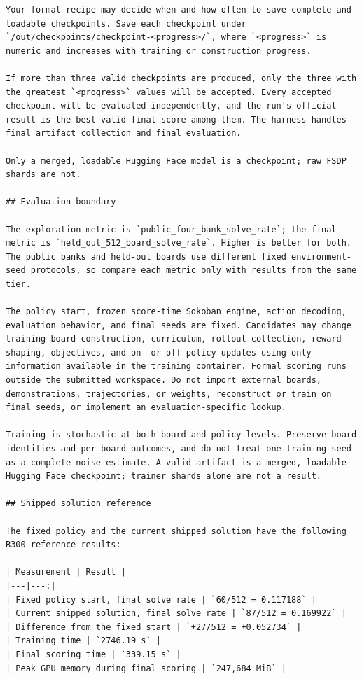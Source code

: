 \begin{lstlisting}[style=contract]
Your formal recipe may decide when and how often to save complete and loadable checkpoints. Save each checkpoint under `/out/checkpoints/checkpoint-<progress>/`, where `<progress>` is numeric and increases with training or construction progress.

If more than three valid checkpoints are produced, only the three with the greatest `<progress>` values will be accepted. Every accepted checkpoint will be evaluated independently, and the run's official result is the best valid final score among them. The harness handles final artifact collection and final evaluation.

Only a merged, loadable Hugging Face model is a checkpoint; raw FSDP shards are not.

## Evaluation boundary

The exploration metric is `public_four_bank_solve_rate`; the final metric is `held_out_512_board_solve_rate`. Higher is better for both. The public banks and held-out boards use different fixed environment-seed protocols, so compare each metric only with results from the same tier.

The policy start, frozen score-time Sokoban engine, action decoding, evaluation behavior, and final seeds are fixed. Candidates may change training-board construction, curriculum, rollout collection, reward shaping, objectives, and on- or off-policy updates using only information available in the training container. Formal scoring runs outside the submitted workspace. Do not import external boards, demonstrations, trajectories, or weights, reconstruct or train on final seeds, or implement an evaluation-specific lookup.

Training is stochastic at both board and policy levels. Preserve board identities and per-board outcomes, and do not treat one training seed as a complete noise estimate. A valid artifact is a merged, loadable Hugging Face checkpoint; trainer shards alone are not a result.

## Shipped solution reference

The fixed policy and the current shipped solution have the following B300 reference results:

| Measurement | Result |
|---|---:|
| Fixed policy start, final solve rate | `60/512 = 0.117188` |
| Current shipped solution, final solve rate | `87/512 = 0.169922` |
| Difference from the fixed start | `+27/512 = +0.052734` |
| Training time | `2746.19 s` |
| Final scoring time | `339.15 s` |
| Peak GPU memory during final scoring | `247,684 MiB` |


\end{lstlisting}
